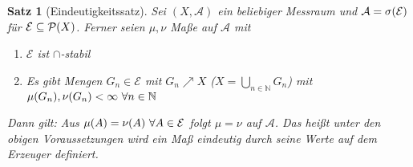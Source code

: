 \documentclass[11pt, twoside, a4paper]{article}
\theoremstyle{plain}
\newtheorem{satz}[blockelement]{Satz}
\numberwithin{equation}{subsection}
\newcommand{\of}[1]{\mathopen{}\mathclose{}\bgroup\left(#1\aftergroup\egroup\right)}
\newcommand{\N}{\mathbb{N}}
\newcommand{\mA}{\mathcal{A}}
\newcommand{\mE}{\mathcal{E}}
\newcommand{\mP}{\mathcal{P}}
\begin{document}
    \begin{satz}[Eindeutigkeitssatz]
        \marginnote{[04. Nov]}
        \label{satz:eindeutigkeitssatz}
        Sei $(X, \mA)$ ein beliebiger Messraum und $\mA = \sigma\of{\mE}$ für $\mE \subseteq\mP\of{X}$. Ferner seien $\mu, \nu$ Maße auf $\mA$ mit
        \begin{enumerate}[label=(\alph*)]
            \item $\mE$ ist $\cap$-stabil
            \item Es gibt Mengen $G_n \in \mE$ mit $G_n \nearrow X$ ($X = \bigcup_{n\in\N} G_n$) mit $\mu\of{G_n}, \nu\of{G_n} < \infty~\forall n\in\N$
        \end{enumerate}
        Dann gilt: Aus $\mu\of{A} = \nu\of{A}~\forall A\in\mE$ folgt $\mu = \nu$ auf $\mA$. Das heißt unter den obigen Voraussetzungen wird ein Maß eindeutig durch seine Werte auf dem Erzeuger definiert.


\end{satz}
\end{document}

